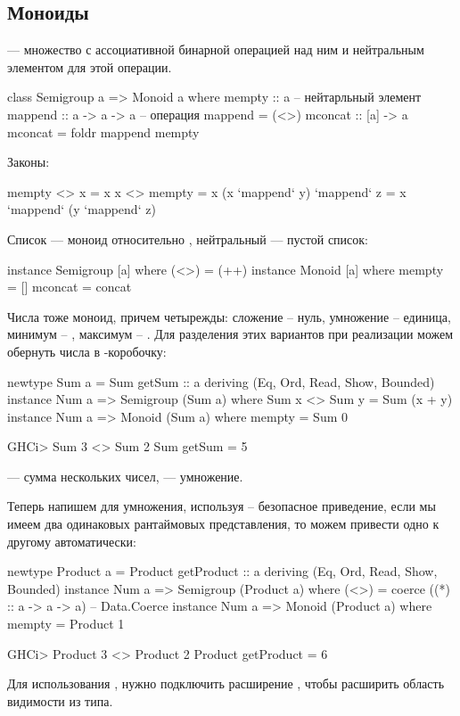 \documentclass[11pt,a4paper]{article}
\begin{document}
\subsection{Моноиды}
 --- множество с ассоциативной бинарной операцией над ним и нейтральным элементом для этой операции.
\begin{hscode}
class Semigroup a => Monoid a where
  mempty :: a  -- нейтарльный элемент
  mappend :: a -> a -> a  -- операция
  mappend = (<>)
  mconcat :: [a] -> a
  mconcat = foldr mappend mempty
\end{hscode}
Законы:
\begin{hscode}
mempty <> x = x
x <> mempty = x
(x `mappend` y) `mappend` z = x `mappend` (y `mappend` z)
\end{hscode}
Список --- моноид относительно \hs{(++)}, нейтральный --- пустой список:
\begin{hscode}
instance Semigroup [a] where
  (<>) = (++)
instance Monoid [a] where
  mempty = []
  mconcat = concat
\end{hscode}
Числа тоже моноид, причем четырежды: сложение -- нуль, умножение -- единица, минимум -- , максимум -- .
Для разделения этих вариантов при реализации можем обернуть числа в -коробочку:
\begin{hscode}
newtype Sum a = Sum { getSum :: a} deriving (Eq, Ord, Read, Show, Bounded)
instance Num a => Semigroup (Sum a) where
  Sum x <> Sum y = Sum (x + y)
instance Num a => Monoid (Sum a) where
  mempty = Sum 0

GHCi> Sum 3 <> Sum 2 
Sum {getSum = 5}
\end{hscode}
 --- сумма нескольких чисел,  --- умножение.

Теперь напишем для умножения, используя  -- безопасное приведение, если мы имеем два одинаковых рантаймовых представления, то можем привести одно к другому автоматически:
\begin{hscode}
newtype Product a = Product { getProduct :: a} deriving (Eq, Ord, Read, Show, Bounded)
instance Num a => Semigroup (Product a) where
  (<>) = coerce ((*) :: a -> a -> a)  -- Data.Coerce
instance Num a => Monoid (Product a) where
  mempty = Product 1

GHCi> Product 3 <> Product 2 
Product {getProduct = 6}
\end{hscode}
Для использования , нужно подключить расширение , чтобы расширить область видимости  из типа.
\end{document}
